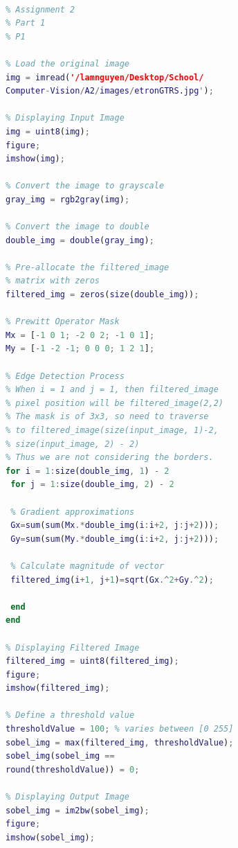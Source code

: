 \documentclass[conference]{IEEEtran}
\begin{document}
\begin{lstlisting}[language=Matlab]

% Assignment 2
% Part 1
% P1

% Load the original image
img = imread('/lamnguyen/Desktop/School/
Computer-Vision/A2/images/etronGTRS.jpg');

% Displaying Input Image
img = uint8(img);
figure; 
imshow(img); 

% Convert the image to grayscale
gray_img = rgb2gray(img);

% Convert the image to double
double_img = double(gray_img);
  
% Pre-allocate the filtered_image 
% matrix with zeros
filtered_img = zeros(size(double_img));

% Prewitt Operator Mask
Mx = [-1 0 1; -2 0 2; -1 0 1];
My = [-1 -2 -1; 0 0 0; 1 2 1];

% Edge Detection Process
% When i = 1 and j = 1, then filtered_image 
% pixel position will be filtered_image(2,2)
% The mask is of 3x3, so need to traverse
% to filtered_image(size(input_image, 1)-2,
% size(input_image, 2) - 2)
% Thus we are not considering the borders.
for i = 1:size(double_img, 1) - 2
 for j = 1:size(double_img, 2) - 2

 % Gradient approximations
 Gx=sum(sum(Mx.*double_img(i:i+2, j:j+2)));
 Gy=sum(sum(My.*double_img(i:i+2, j:j+2)));
				
 % Calculate magnitude of vector
 filtered_img(i+1, j+1)=sqrt(Gx.^2+Gy.^2);
		
 end
end

% Displaying Filtered Image
filtered_img = uint8(filtered_img);
figure;
imshow(filtered_img);
  
% Define a threshold value
thresholdValue = 100; % varies between [0 255]
sobel_img = max(filtered_img, thresholdValue);
sobel_img(sobel_img == 
round(thresholdValue)) = 0;
  
% Displaying Output Image
sobel_img = im2bw(sobel_img);
figure;
imshow(sobel_img);  

\end{lstlisting}
\end{document}
